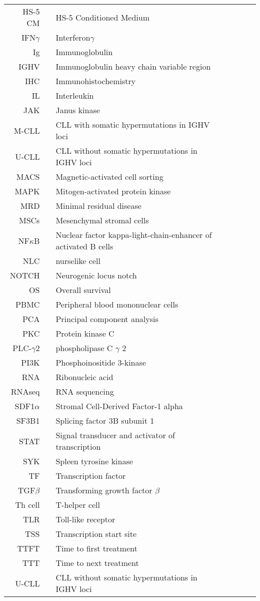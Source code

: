 \documentclass[11pt, a4paper, twosided]{book}
\begin{document}
\begin{tabular}{rp{0.2cm}lp{1cm}rp{0.2cm}l}
    
  HS-5 CM & & HS-5 Conditioned Medium  \\
    IFN$\gamma$ & & Interferon$\gamma$   \\  
    Ig & & Immunoglobulin \\
    IGHV & & Immunoglobulin heavy chain variable region \\
    IHC & & Immunohistochemistry \\
    IL & & Interleukin \\
    JAK & & Janus kinase \\
    M-CLL & & CLL with somatic hypermutations in IGHV loci \\
    U-CLL & & CLL without somatic hypermutations in IGHV loci \\
    MACS & & Magnetic-activated cell sorting \\
    MAPK & & Mitogen-activated protein kinase  \\
    MRD & & Minimal residual disease  \\
    MSCs & & Mesenchymal stromal cells  \\
    NF$\kappa$B & & Nuclear factor kappa-light-chain-enhancer of activated B cells \\
    NLC & & nurselike cell  \\
    NOTCH & & Neurogenic locus notch  \\
    OS & & Overall survival \\
    PBMC & & Peripheral blood mononuclear cells \\
    PCA & & Principal component analysis \\
    PKC & & Protein kinase C \\
    PLC-$\gamma$2 & & phospholipase C $\gamma$ 2 \\
    PI3K & & Phosphoinositide 3-kinase \\
    RNA & & Ribonucleic acid  \\
    RNAseq & & RNA sequencing \\
    SDF1$\alpha$ & & Stromal Cell-Derived Factor-1 alpha  \\
    SF3B1 & & Splicing factor 3B subunit 1 \\
    STAT & & Signal transducer and activator of transcription \\
    SYK & & Spleen tyrosine kinase \\
    TF & & Transcription factor \\
    TGF$\beta$ & & Transforming growth factor $\beta$ \\
    Th cell & & T-helper cell \\
    TLR & & Toll-like receptor \\ 
    TSS & & Transcription start site \\
    TTFT & & Time to first treatment \\
    TTT & & Time to next treatment \\
    U-CLL & & CLL without somatic hypermutations in IGHV loci \\
    
\end{tabular}
\end{document}
